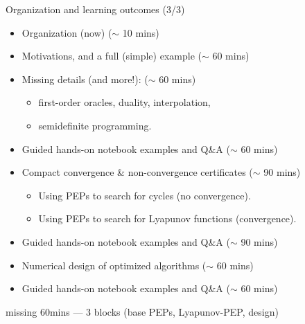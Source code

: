\documentclass[aspectratio=169]{beamer}
\begin{document}
\begin{frame}{Organization and learning outcomes (3/3)}
\begin{itemize}
    \item[0.] Organization (now) \hfill ($\sim$ 10 mins)
    \item[1.] Motivations, and a full (simple) example \hfill ($\sim$ 60 mins)
    \item[2.] Missing details (and more!):  \hfill ($\sim$ 60 mins)
    \begin{itemize}
    	\item first-order oracles, duality, interpolation,
    	\item semidefinite programming.
    \end{itemize}
    \item[3.] Guided hands-on notebook examples and Q\&A \hfill ($\sim$ 60 mins)
    \item[4.] Compact convergence \& non-convergence certificates \hfill ($\sim$ 90 mins)
    \begin{itemize}
        \item Using PEPs to search for cycles (no convergence).
        \item Using PEPs to search for Lyapunov functions (convergence).
    \end{itemize}
    \item[5.] Guided hands-on notebook examples and Q\&A \hfill ($\sim$ 90 mins)
    \item[6.] Numerical design of optimized algorithms \hfill ($\sim$ 60 mins)
    \item[7.] Guided hands-on notebook examples and Q\&A \hfill ($\sim$ 60 mins)
\end{itemize}
{\color{red}missing 60mins --- 3 blocks (base PEPs, Lyapunov-PEP, design)}
\end{frame}
\end{document}
